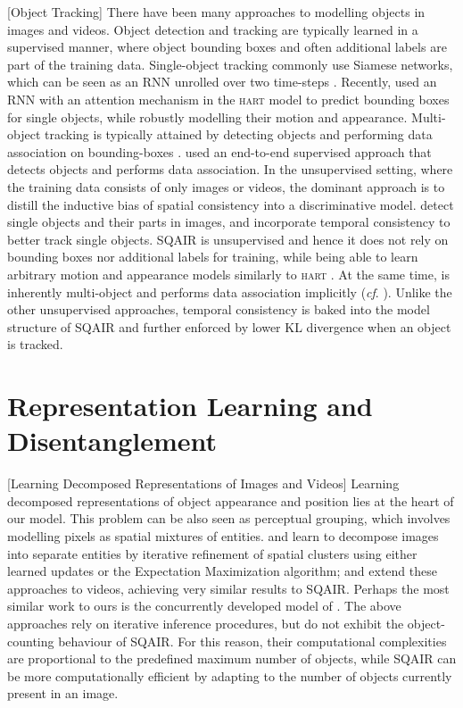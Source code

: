 		[Object Tracking]
	There have been many approaches to modelling objects in images and videos. 
	Object detection and tracking are typically learned in a supervised manner, where object bounding boxes and often additional labels are part of the training data.
	Single-object tracking commonly use Siamese networks, which can be seen as an \gls{RNN} unrolled over two time-steps \citep{Valmadre2017}. Recently, \cite{Kosiorek2017hierch} used an \gls{RNN} with an attention mechanism in the \textsc{hart} model to predict bounding boxes for single objects, while robustly modelling their motion and appearance. Multi-object tracking is typically attained by detecting objects and performing data association on bounding-boxes \citep{Bewley2016sort}.
	\cite{Schulter2017deepnf} used an end-to-end supervised approach that detects objects and performs data association.
	In the unsupervised setting, where the training data consists of only images or videos, the dominant approach is to distill the inductive bias of spatial consistency into a discriminative model.  \cite{Cho2015unsupervised} detect single objects and their parts in images, and \cite{Kwak2015unsupervised,Xiao2016track} incorporate temporal consistency to better track single objects.
	\Gls{SQAIR} is unsupervised and hence it does not rely on bounding boxes nor additional labels for training, while being able to learn arbitrary motion and appearance models similarly to \textsc{hart} \citep{Kosiorek2017hierch}.
	At the same time, is inherently multi-object and performs data association implicitly (\textit{cf}. ).
	Unlike the other unsupervised approaches, temporal consistency is baked into the model structure of \gls{SQAIR} and further enforced by lower \gls{KL} divergence when an object is tracked.


\section{Representation Learning and Disentanglement}
\label{sec:repr_learning}


		[Learning Decomposed Representations of Images and Videos]
	Learning decomposed representations of object appearance and position lies at the heart of our model.
	This problem can be also seen as perceptual grouping, which involves modelling pixels as spatial mixtures of entities.
	\cite{Greff2016tagger} and \cite{Greff2017neuralem} learn to decompose images into separate entities by iterative refinement of spatial clusters using either learned updates or the Expectation Maximization algorithm;
	\cite{Ilin2017recurrentln} and \cite{Steenkiste2018} extend these approaches to videos, achieving very similar results to \gls{SQAIR}.
	Perhaps the most similar work to ours is the concurrently developed model of \cite{Hsieh2018ddpae}.
	The above approaches rely on iterative inference procedures, but do not exhibit the object-counting behaviour of \gls{SQAIR}.
	For this reason, their computational complexities are proportional to the predefined maximum number of objects, while \gls{SQAIR} can be more computationally efficient by adapting to the number of objects currently present in an image.
	
